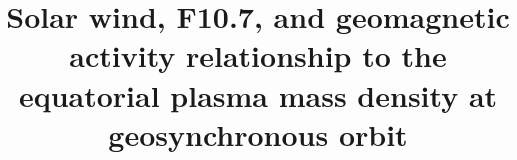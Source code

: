 \documentclass[draft,linenumbers]{agujournal}
\begin{document}
% 
%


\title{Solar wind, F10.7, and geomagnetic activity relationship to the equatorial plasma mass density at geosynchronous orbit}

%
%










\end{document}
